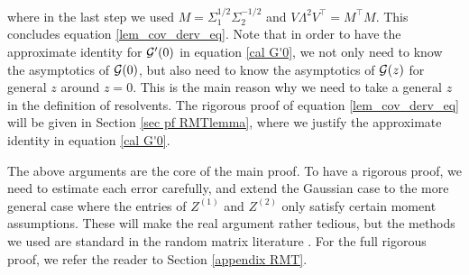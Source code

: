 where in the last step we used $M = \Sigma_1^{1/2}\Sigma_2^{-1/2}$ and $V \Lambda^2 V^\top=M^\top M$. This concludes equation \eqref{lem_cov_derv_eq}.
Note that in order to have the approximate identity for $\cal G'(0)$ in equation \eqref{cal G'0}, we not only need to know the asymptotics of $\cal G(0)$, but also need to know the asymptotics of $\cal G(z)$ for general $z$ around $z=0$. This is the main reason why we need to take a general $z$ in the definition of resolvents. The rigorous proof of equation \eqref{lem_cov_derv_eq} will be given in Section \ref{sec pf RMTlemma}, where we justify the approximate identity in equation \eqref{cal G'0}.
%


The above arguments are the core of the main proof. To have a rigorous proof, we need to estimate each error carefully, and extend the Gaussian case to the more general case where the entries of $Z^{(1)}$ and $Z^{(2)}$ only satisfy certain moment assumptions. These will make the real argument rather tedious, but the methods we used are standard in the random matrix literature \cite{erdos2017dynamical,Anisotropic}. For the full rigorous proof, we refer the reader to Section \ref{appendix RMT}.


